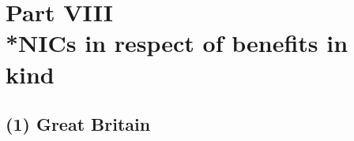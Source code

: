 \documentclass[12pt,a4paper]{article}
\begin{document}


\section[Part VIII --- NICs in respect of benefits in kind]{Part VIII\\*NICs in respect of benefits in kind}

\renewcommand\parthead{--- Schedule 9 Part VIII}

\subsection*{(1) 
Great Britain}
\end{document}
